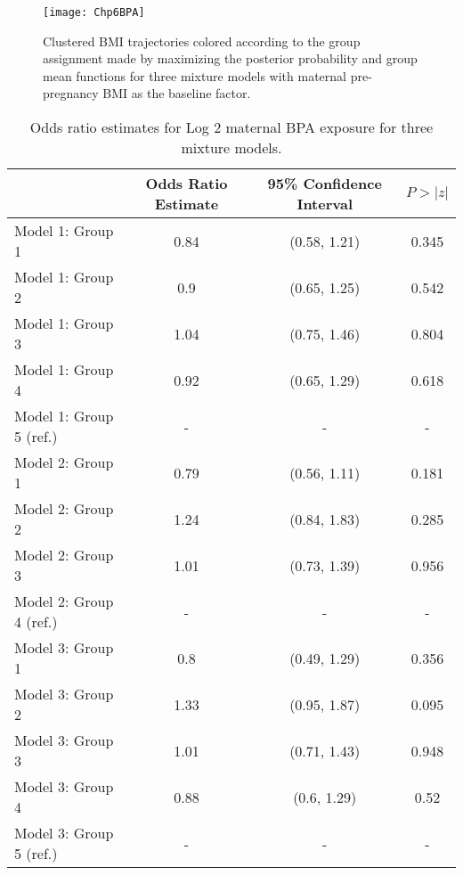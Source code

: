 \begin{figure}[h]
\begin{center}
\texttt{[image: Chp6BPA]}
\end{center}
\label{fig:6-2}
\caption{Clustered BMI trajectories colored according to the group assignment made by maximizing the posterior probability and group mean functions for three mixture models with maternal pre-pregnancy BMI as the baseline factor.}
\end{figure}

\begin{table}[ht]
\begin{center}
\begin{tabular}{lccc}
  \hline
 & Odds Ratio Estimate & 95\% Confidence Interval & $P>|z|$ \\ 
  \hline
Model 1: Group  1 & 0.84 & (0.58, 1.21) & 0.345 \\ 
  Model 1: Group  2 & 0.9 & (0.65, 1.25) & 0.542 \\ 
  Model 1: Group  3 & 1.04 & (0.75, 1.46) & 0.804 \\ 
  Model 1: Group  4 & 0.92 & (0.65, 1.29) & 0.618 \\ 
  Model 1: Group  5  (ref.) & - & - & - \\ 
  Model 2: Group  1 & 0.79 & (0.56, 1.11) & 0.181 \\ 
  Model 2: Group  2 & 1.24 & (0.84, 1.83) & 0.285 \\ 
  Model 2: Group  3 & 1.01 & (0.73, 1.39) & 0.956 \\ 
  Model 2: Group  4  (ref.) & - & - & - \\ 
  Model 3: Group  1 & 0.8 & (0.49, 1.29) & 0.356 \\ 
  Model 3: Group  2 & 1.33 & (0.95, 1.87) & 0.095 \\ 
  Model 3: Group  3 & 1.01 & (0.71, 1.43) & 0.948 \\ 
  Model 3: Group  4 & 0.88 & (0.6, 1.29) & 0.52 \\ 
  Model 3: Group  5  (ref.) & - & - & - \\ 
   \hline
\end{tabular}
\caption{Odds ratio estimates for Log 2 maternal BPA exposure for three mixture models. }
\end{center}
\label{tab:6-2}
\end{table}

